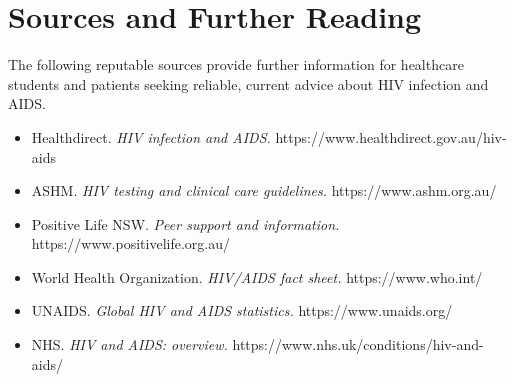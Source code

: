 \section*{Sources and Further Reading}
The following reputable sources provide further information for healthcare students and patients seeking reliable, current advice about HIV infection and AIDS.

\begin{itemize}
    \item Healthdirect. \textit{HIV infection and AIDS.} https://www.healthdirect.gov.au/hiv-aids
    \item ASHM. \textit{HIV testing and clinical care guidelines.} https://www.ashm.org.au/
    \item Positive Life NSW. \textit{Peer support and information.} https://www.positivelife.org.au/
    \item World Health Organization. \textit{HIV/AIDS fact sheet.} https://www.who.int/
    \item UNAIDS. \textit{Global HIV and AIDS statistics.} https://www.unaids.org/
    \item NHS. \textit{HIV and AIDS: overview.} https://www.nhs.uk/conditions/hiv-and-aids/
\end{itemize}
